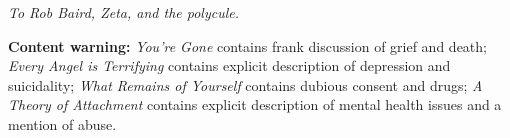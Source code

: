 \null

\vfill

\begin{flushright}
    \emph{To Rob Baird, Zeta, and the polycule.}
\end{flushright}

\vfill

\noindent \textbf{Content warning:} \emph{You're Gone} contains frank discussion of grief and death; \emph{Every Angel is Terrifying} contains explicit description of depression and suicidality; \emph{What Remains of Yourself} contains dubious consent and drugs; \emph{A Theory of Attachment} contains explicit description of mental health issues and a mention of abuse.
